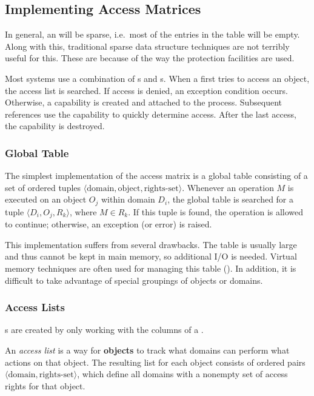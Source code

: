 \subsection{Implementing Access Matrices}\label{subsec:Implement_Access_Matrices}
In general, an  will be sparse, i.e.\ most of the entries in the table will be empty.
Along with this, traditional sparse data structure techniques are not terribly useful for this.
These are because of the way the protection facilities are used.

Most systems use a combination of s and s.
When a  first tries to access an object, the access list is searched.
If access is denied, an exception condition occurs.
Otherwise, a capability is created and attached to the process.
Subsequent references use the capability to quickly determine access.
After the last access, the capability is destroyed.

\subsubsection{Global Table}\label{subsubsec:Global_Access_Matrix}
The simplest implementation of the access matrix is a global table consisting of a set of ordered tuples $\langle \text{domain}, \text{object}, \text{rights-set} \rangle$.
Whenever an operation $M$ is executed on an object $O_{j}$ within domain $D_{i}$, the global table is searched for a tuple $\langle D_{i}, O_{j}, R_{k} \rangle$, where $M \in R_{k}$.
If this tuple is found, the operation is allowed to continue; otherwise, an exception (or error) is raised.

This implementation suffers from several drawbacks.
The table is usually large and thus cannot be kept in main memory, so additional I/O is needed.
Virtual memory techniques are often used for managing this table ().
In addition, it is difficult to take advantage of special groupings of objects or domains.

\subsubsection{Access Lists}\label{subsubsec:Access_Lists}
s are created by only working with the columns of a .

\begin{definition}\label{def:Access_List}
  An \emph{access list} is a way for \textbf{objects} to track what domains can perform what actions on that object.
   The resulting list for each object consists of ordered pairs $\langle \text{domain}, \text{rights-set} \rangle$, which define all domains with a nonempty set of access rights for that object.
\end{definition}

